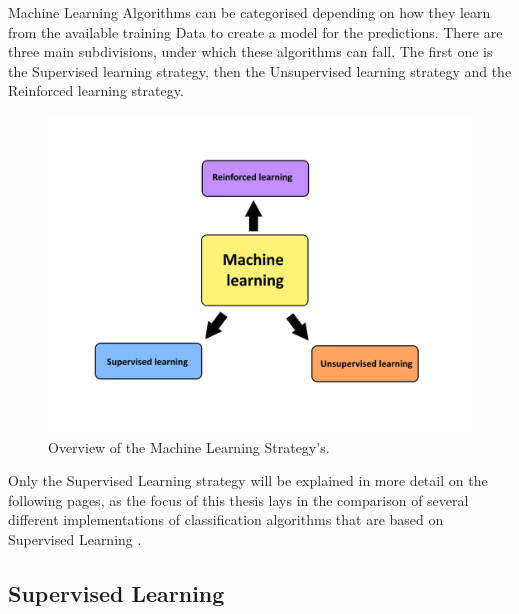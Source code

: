 \documentclass[12pt,oneside,a4paper,parskip]{scrbook}
\begin{document}
Machine Learning Algorithms can be categorised depending on how they learn from the available training Data to create 
a model for the predictions. There are three main subdivisions, under which these algorithms can fall. 
The first one is the Supervised learning strategy, then the Unsupervised learning strategy and the Reinforced learning 
strategy. 

\begin{figure}
  \includegraphics[width=\linewidth]{Overview_ml}
  \caption{Overview of the Machine Learning Strategy's.}
  \label{fig:overview_ML}
\end{figure}

Only the Supervised Learning strategy will be explained in more detail on the following pages, as the focus of this 
thesis lays in the comparison of several different implementations of classification algorithms that are based on 
Supervised Learning \cite{IntroML}.

\subsection{Supervised Learning}
\end{document}

